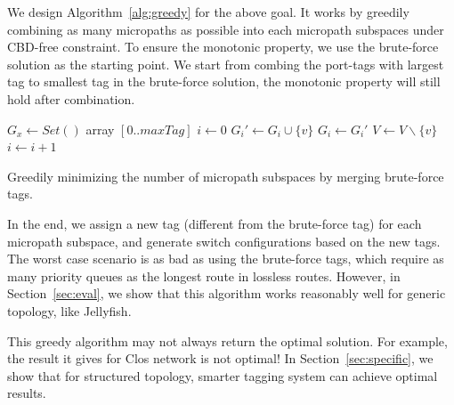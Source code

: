  We design Algorithm~\ref{alg:greedy} for the above goal.
It works by greedily combining as many micropaths as possible into each micropath subspaces under CBD-free constraint.
To ensure the monotonic property, we use the brute-force solution as the starting point. We start from combing the port-tags 
with largest tag to smallest tag in the brute-force solution,
the monotonic property will still hold after combination. 


\begin{algorithm}
	$G_x \gets Set()$ array $[0..maxTag]$\; 
	$i \gets 0$\;
	 {
		 {
			$G_i' \gets G_i \cup \{v\}$ \;
			 {
				$G_i \gets G_i'$ \; 
			}
			$V \gets V \backslash \{v\}$ \;
		}
		 {
			$i \gets i+1$\;
		}
	}
	\;
    \caption{Greedily minimizing the number of micropath subspaces by merging brute-force tags.}
	\label{alg:greedy}
\end{algorithm}

In the end, we assign a new tag (different from the brute-force tag) for each micropath subspace, and generate switch configurations
based on the new tags. The worst case scenario is as bad as using the brute-force tags, which require
as many priority queues as the longest route in lossless routes. However,
in Section~\ref{sec:eval}, we show that this algorithm works reasonably well for generic topology, like Jellyfish. 

This greedy algorithm may not always return the optimal solution. For example, the result it gives for Clos network is not 
optimal! In Section~\ref{sec:specific}, we show that for structured topology, smarter tagging system can achieve optimal results.

%	
%
%	
